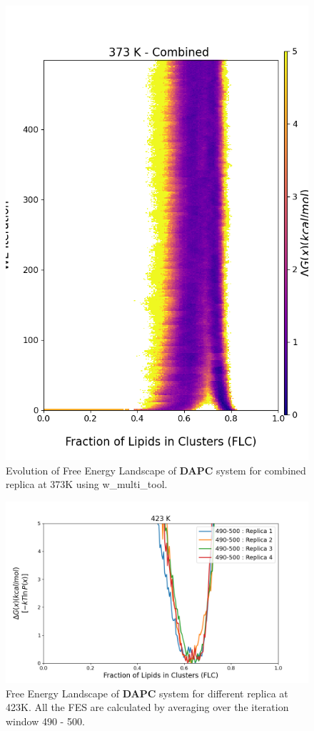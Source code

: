 \documentclass{biophys-new}
\begin{document}
\begin{figure}[hbt!]
\centering
\includegraphics[width=0.8\linewidth]{all_plots/ClusterLipids2Total/DPPC_DAPC_CHOL/373K/Evolution_DAPC_MULTI__373_ClusterLipids2Total.png}
\caption{Evolution of Free Energy Landscape of \textbf{DAPC} system for combined replica at 373K using w\_multi\_tool.}
\label{fig:view}

\end{figure}


\begin{figure}[hbt!]
\centering
\includegraphics[width=1.1\linewidth]{all_plots/ClusterLipids2Total/DPPC_DAPC_CHOL/423K/Average_DAPC_423_ClusterLipids2Total.png}
\caption{Free Energy Landscape of \textbf{DAPC} system for different replica at 423K. All the FES are calculated by averaging over the iteration window 490 - 500.}
\label{fig:view}

\end{figure}
\end{document}
